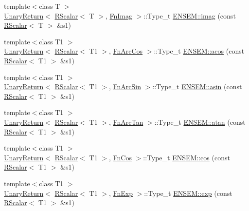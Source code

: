 \begin{DoxyCompactItemize}
\item 
{\footnotesize template$<$class T $>$ }\\\mbox{\hyperlink{structENSEM_1_1UnaryReturn}{Unary\+Return}}$<$ \mbox{\hyperlink{classENSEM_1_1RScalar}{R\+Scalar}}$<$ T $>$, \mbox{\hyperlink{structENSEM_1_1FnImag}{Fn\+Imag}} $>$\+::Type\+\_\+t \mbox{\hyperlink{group__rscalar_ga4ab56867e71bfd12d8b60d8f60010c73}{E\+N\+S\+E\+M\+::imag}} (const \mbox{\hyperlink{classENSEM_1_1RScalar}{R\+Scalar}}$<$ T $>$ \&s1)
\item 
{\footnotesize template$<$class T1 $>$ }\\\mbox{\hyperlink{structENSEM_1_1UnaryReturn}{Unary\+Return}}$<$ \mbox{\hyperlink{classENSEM_1_1RScalar}{R\+Scalar}}$<$ T1 $>$, \mbox{\hyperlink{structENSEM_1_1FnArcCos}{Fn\+Arc\+Cos}} $>$\+::Type\+\_\+t \mbox{\hyperlink{group__rscalar_gad83b7c66ca2adeacdccb66ae00e407c9}{E\+N\+S\+E\+M\+::acos}} (const \mbox{\hyperlink{classENSEM_1_1RScalar}{R\+Scalar}}$<$ T1 $>$ \&s1)
\item 
{\footnotesize template$<$class T1 $>$ }\\\mbox{\hyperlink{structENSEM_1_1UnaryReturn}{Unary\+Return}}$<$ \mbox{\hyperlink{classENSEM_1_1RScalar}{R\+Scalar}}$<$ T1 $>$, \mbox{\hyperlink{structENSEM_1_1FnArcSin}{Fn\+Arc\+Sin}} $>$\+::Type\+\_\+t \mbox{\hyperlink{group__rscalar_ga74e5212c5ef434f0f0f94bf61b79f0fb}{E\+N\+S\+E\+M\+::asin}} (const \mbox{\hyperlink{classENSEM_1_1RScalar}{R\+Scalar}}$<$ T1 $>$ \&s1)
\item 
{\footnotesize template$<$class T1 $>$ }\\\mbox{\hyperlink{structENSEM_1_1UnaryReturn}{Unary\+Return}}$<$ \mbox{\hyperlink{classENSEM_1_1RScalar}{R\+Scalar}}$<$ T1 $>$, \mbox{\hyperlink{structENSEM_1_1FnArcTan}{Fn\+Arc\+Tan}} $>$\+::Type\+\_\+t \mbox{\hyperlink{group__rscalar_ga540f6e66ddf6d73bc001906c1578e737}{E\+N\+S\+E\+M\+::atan}} (const \mbox{\hyperlink{classENSEM_1_1RScalar}{R\+Scalar}}$<$ T1 $>$ \&s1)
\item 
{\footnotesize template$<$class T1 $>$ }\\\mbox{\hyperlink{structENSEM_1_1UnaryReturn}{Unary\+Return}}$<$ \mbox{\hyperlink{classENSEM_1_1RScalar}{R\+Scalar}}$<$ T1 $>$, \mbox{\hyperlink{structENSEM_1_1FnCos}{Fn\+Cos}} $>$\+::Type\+\_\+t \mbox{\hyperlink{group__rscalar_ga5d977b28190b3cf44c5ef2aa98af9156}{E\+N\+S\+E\+M\+::cos}} (const \mbox{\hyperlink{classENSEM_1_1RScalar}{R\+Scalar}}$<$ T1 $>$ \&s1)
\item 
{\footnotesize template$<$class T1 $>$ }\\\mbox{\hyperlink{structENSEM_1_1UnaryReturn}{Unary\+Return}}$<$ \mbox{\hyperlink{classENSEM_1_1RScalar}{R\+Scalar}}$<$ T1 $>$, \mbox{\hyperlink{structENSEM_1_1FnExp}{Fn\+Exp}} $>$\+::Type\+\_\+t \mbox{\hyperlink{group__rscalar_ga7555010fd1580f0b6a1d85cd4e925ce1}{E\+N\+S\+E\+M\+::exp}} (const \mbox{\hyperlink{classENSEM_1_1RScalar}{R\+Scalar}}$<$ T1 $>$ \&s1)

\end{DoxyCompactItemize}
